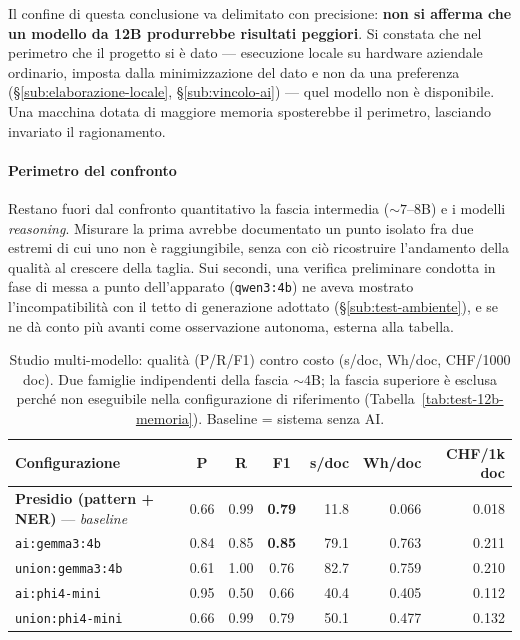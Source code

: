 Il confine di questa conclusione va delimitato con precisione: \textbf{non si afferma che un modello da 12B produrrebbe risultati peggiori}. Si constata che nel perimetro che il progetto si è dato --- esecuzione locale su hardware aziendale ordinario, imposta dalla minimizzazione del dato e non da una preferenza (§\ref{sub:elaborazione-locale}, §\ref{sub:vincolo-ai}) --- quel modello non è disponibile. Una macchina dotata di maggiore memoria sposterebbe il perimetro, lasciando invariato il ragionamento.

\paragraph*{Perimetro del confronto} Restano fuori dal confronto quantitativo la fascia intermedia (${\sim}7$--$8$B) e i modelli \textit{reasoning}. Misurare la prima avrebbe documentato un punto isolato fra due estremi di cui uno non è raggiungibile, senza con ciò ricostruire l'andamento della qualità al crescere della taglia. Sui secondi, una verifica preliminare condotta in fase di messa a punto dell'apparato (\texttt{qwen3:4b}) ne aveva mostrato l'incompatibilità con il tetto di generazione adottato (§\ref{sub:test-ambiente}), e se ne dà conto più avanti come osservazione autonoma, esterna alla tabella.

\begin{table}
	\centering
	\caption{Studio multi-modello: qualità (P/R/F1) contro costo (s/doc, Wh/doc, CHF/1000 doc). Due famiglie indipendenti della fascia ${\sim}4$B; la fascia superiore è esclusa perché non eseguibile nella configurazione di riferimento (Tabella~\ref{tab:test-12b-memoria}). Baseline = sistema senza AI.}
	\label{tab:test-ai-benchmark}
	\small
	\begin{tabular}{|l|c|c|c|r|r|r|}
		\hline
		\textbf{Configurazione}                                 & \textbf{P} & \textbf{R} & \textbf{F1}   & \textbf{s/doc} & \textbf{Wh/doc} & \textbf{CHF/1k doc} \\
		\hline
		\textbf{Presidio (pattern + NER)} --- \textit{baseline} & 0.66       & 0.99       & \textbf{0.79} & 11.8           & 0.066           & 0.018               \\
		\hline
		\texttt{ai:gemma3:4b}                                   & 0.84       & 0.85       & \textbf{0.85} & 79.1           & 0.763           & 0.211               \\
		\hline
		\texttt{union:gemma3:4b}                                & 0.61       & 1.00       & 0.76          & 82.7           & 0.759           & 0.210               \\
		\hline
		\texttt{ai:phi4-mini}                                   & 0.95       & 0.50       & 0.66          & 40.4           & 0.405           & 0.112               \\
		\hline
		\texttt{union:phi4-mini}                                & 0.66       & 0.99       & 0.79          & 50.1           & 0.477           & 0.132               \\
		\hline
	\end{tabular}
\end{table}

